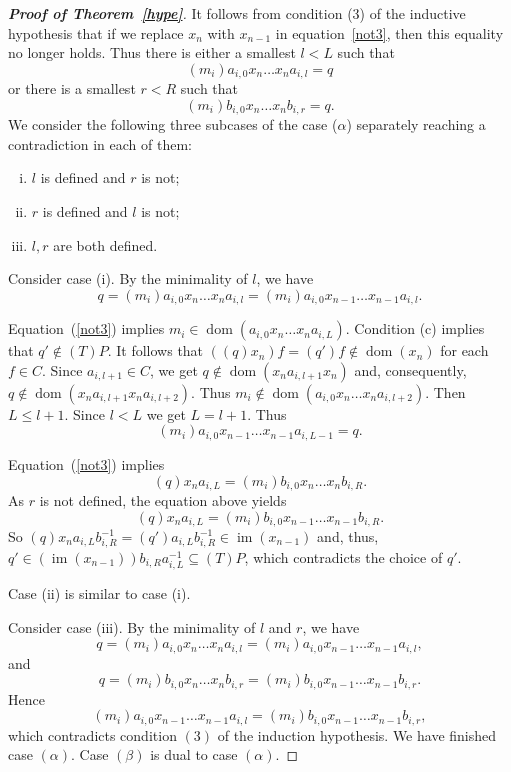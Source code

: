 \documentclass[11pt]{amsart}
\theoremstyle{definition}
\newcommand{\im}{\operatorname{im}}
\newcommand{\dom}{\operatorname{dom}}
\begin{document}
\begin{proof}[{\bf Proof of Theorem~\ref{hype}}]
It follows from condition (3) of the inductive hypothesis that if we replace \(x_n\) with \(x_{n-1}\) in equation~\ref{not3}, then this equality no longer holds. 
Thus there is either a smallest \(l<L\) such that
\[(m_i)a_{i, 0}x_{n} \ldots x_{n} a_{i, l} = q\]
or there is a smallest \(r<R\) such that
\[(m_i)b_{i, 0}x_{n} \ldots x_{n} b_{i, r} = q.\]
We consider the following three subcases of the case ($\alpha$) separately reaching a contradiction in each of them:
\begin{enumerate}[(i)]
    \item \(l\) is defined and \(r\) is not;
    \item \(r\) is defined and \(l\) is not;
    \item \(l,r\) are both defined.
\end{enumerate}

Consider case (i). 
By the minimality of $l$, we have
\[q=(m_i)a_{i, 0}x_{n} \ldots x_{n} a_{i, l}=(m_i)a_{i, 0}x_{n-1} \ldots x_{n-1} a_{i, l}.\]

Equation~(\ref{not3}) implies
\(m_i\in \operatorname{dom}(a_{i, 0}x_{n} \ldots x_{n} a_{i, L}) \). Condition (c) implies that $q'\notin (T)P$. It follows that $((q)x_n)f=(q')f\notin \dom(x_n)$ for each $f\in C$.
Since $a_{i,l+1}\in C$, we get $q\notin \dom(x_na_{i,l+1}x_n)$ and, consequently, $q\notin \dom(x_na_{i,l+1}x_na_{i,l+2})$. Thus \(m_i\notin \operatorname{dom}(a_{i, 0}x_{n} \ldots x_{n} a_{i, l+2})\).
Then $L\leq l+1$. Since $l<L$ we get \(L=l+1\).
Thus
\[(m_i)a_{i, 0}x_{n-1} \ldots x_{n-1} a_{i, L-1} = q.\]

Equation~(\ref{not3}) implies
\[(q)x_na_{i,L} =(m_i)b_{i, 0}x_{n} \ldots x_{n} b_{i, R}.\]
As \(r\) is not defined, the equation above yields
\[(q)x_na_{i,L} =(m_i)b_{i, 0}x_{n-1} \ldots x_{n-1} b_{i, R}.\]
So \((q)x_na_{i,L}b_{i, R}^{-1}=(q')a_{i,L}b_{i, R}^{-1}\in \im(x_{n-1})\) and, thus, $q'\in (\im(x_{n-1}))b_{i, R}a_{i,L}^{-1}\subseteq (T)P$, which contradicts the choice of \(q'\). %

Case (ii) is similar to case (i).

Consider case (iii). By the minimality of $l$ and $r$, we have
\[q=(m_i)a_{i, 0}x_{n} \ldots x_{n} a_{i, l}=(m_i)a_{i, 0}x_{n-1} \ldots x_{n-1} a_{i, l},\]
and
\[q= (m_i)b_{i, 0}x_{n} \ldots x_{n} b_{i,r}=(m_i)b_{i, 0}x_{n-1} \ldots x_{n-1} b_{i,r}.\]
Hence \[(m_i)a_{i, 0}x_{n-1} \ldots x_{n-1} a_{i, l} =(m_i)b_{i, 0}x_{n-1} \ldots x_{n-1} b_{i,r},\]
which contradicts condition \((3)\) of the induction hypothesis. We have finished case \((\alpha)\). Case \((\beta)\) is dual to case \((\alpha)\).


\end{proof}
\end{document}
